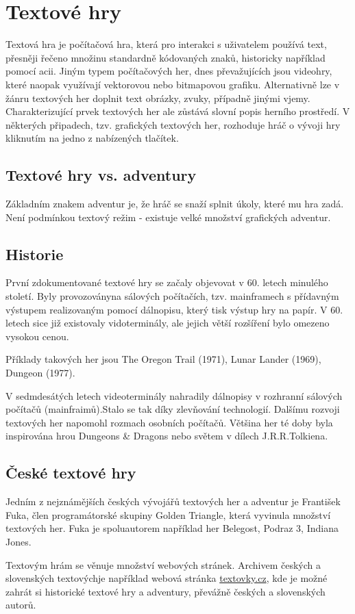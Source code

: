 \documentclass[main.tex]{subfiles}
\begin{document}
\section{Textové hry}
Textová hra je počítačová hra, která pro interakci s uživatelem používá text, přesněji řečeno množinu standardně kódovaných znaků, historicky například pomocí acii. Jiným typem počítačových her, dnes převažujících jsou videohry, které naopak využívají vektorovou nebo bitmapovou grafiku. \cite{web:wik:en:text_game} Alternativně lze v žánru textových her doplnit text obrázky, zvuky, případně jinými vjemy. Charakterizující prvek textových her ale zůstává slovní popis herního prostředí. V některých připadech, tzv. grafických textových her, rozhoduje hráč o vývoji hry kliknutím na jedno z nabízených tlačítek.\cite{web:wik:cz:textova_hra}

\subsection{Textové hry vs. adventury}
Základním znakem adventur je, že hráč se snaží splnit úkoly, které mu hra zadá. Není podmínkou textový režim - existuje velké množství grafických adventur. \cite{}

\subsection{Historie}
První zdokumentované textové hry se začaly objevovat v 60. letech minulého století. Byly provozoványna sálových počítačích, tzv. mainframech s přídavným výstupem realizovaným pomocí dálnopisu, který tisk výstup hry na papír. V 60. letech sice již existovaly vidoterminály, ale jejich větší rozšíření bylo omezeno vysokou cenou. \cite{web:pcmag:en:old_computer_games, web:wik:en:text_game}


Příklady takových her jsou The Oregon Trail (1971), Lunar Lander (1969), Dungeon (1977). \cite{web:pcmag:en:old_computer_games}

V sedmdesátých letech videoterminály nahradily dálnopisy v rozhranní sálových počítačů (mainfraimů).Stalo se tak díky zlevňování technologií. Dalšímu rozvoji textových her napomohl rozmach osobních počítačů. Většina her té doby byla inspirována hrou Dungeons \& Dragons nebo světem v dílech J.R.R.Tolkiena. \cite{web:pcgamer:en:history_of_rpgs}  


\subsection{České textové hry}
Jedním z nejznámějších českých vývojářů textových her a adventur je František Fuka, člen programátorské skupiny Golden Triangle, která vyvinula množství textových her. Fuka je spoluautorem například her Belegost, Podraz 3, Indiana Jones.

Textovým hrám se věnuje množství webových stránek. Archivem českých a slovenských textovýchje například webová stránka \href{https://www.textovky.cz}{textovky.cz}, kde je možné zahrát si historické textové hry a adventury, převážně českých a slovenských autorů. \cite{web:text:cz:archiv}
\end{document}

